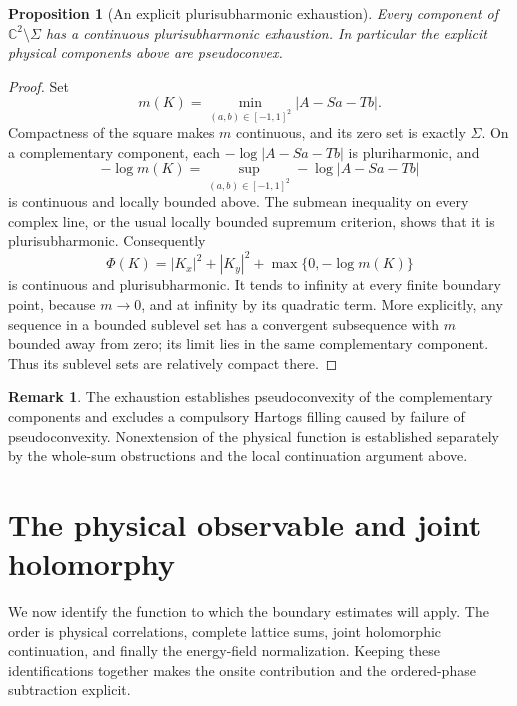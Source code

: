 \documentclass[11pt]{article}
\numberwithin{equation}{section}
\newtheorem{proposition}[theorem]{Proposition}
\theoremstyle{definition}
\newtheorem{remark}[theorem]{Remark}
\newcommand{\C}{\mathbb C}
\begin{document}
\begin{proposition}[An explicit plurisubharmonic exhaustion]
\label{geo:pseudoconvex}
Every component of \(\C^2\setminus\Sigma\) has a continuous
plurisubharmonic exhaustion.  In particular the explicit
physical components above are pseudoconvex.
\end{proposition}

\begin{proof}
Set
\[
 m(K)=\min_{(a,b)\in[-1,1]^2}|A-Sa-Tb|.
\]
Compactness of the square makes \(m\) continuous, and
its zero set is exactly \(\Sigma\).
On a complementary component, each
\(-\log|A-Sa-Tb|\) is pluriharmonic, and
\[
 -\log m(K)=
       \sup_{(a,b)\in[-1,1]^2}-\log|A-Sa-Tb|
\]
is continuous and locally bounded above.
The submean inequality on every complex line, or the
usual locally bounded supremum criterion, shows that
it is plurisubharmonic.  Consequently
\[
 \Phi(K)=|K_x|^2+|K_y|^2+
                      \max\{0,-\log m(K)\}
\]
is continuous and plurisubharmonic.
It tends to infinity at every finite boundary point,
because \(m\to0\), and at infinity by its quadratic
term.  More explicitly, any sequence in a bounded
sublevel set has a convergent subsequence with
\(m\) bounded away from zero; its limit lies in the
same complementary component.  Thus its sublevel
sets are relatively compact there.
\end{proof}

\begin{remark}\label{geo:Hartogs-scope}
The exhaustion establishes pseudoconvexity of the complementary
components and excludes a compulsory Hartogs filling caused by
failure of pseudoconvexity. Nonextension of the physical function
is established separately by the whole-sum obstructions and the
local continuation argument above.
\end{remark}

\section{The physical observable and joint holomorphy}
\label{ana:physical}

We now identify the function to which the boundary estimates will
apply. The order is physical correlations, complete lattice sums,
joint holomorphic continuation, and finally the energy-field
normalization. Keeping these identifications together makes the
onsite contribution and the ordered-phase subtraction explicit.
\end{document}
